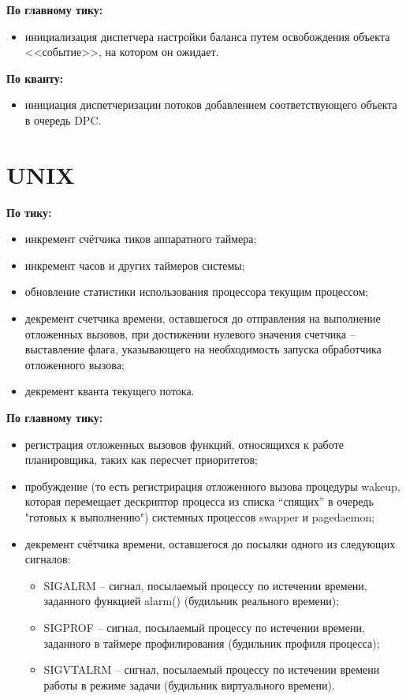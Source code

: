 \documentclass[a4paper, 12pt]{extreport}
\begin{document}
\textbf{По главному тику:}
\begin{itemize}
	\item инициализация диспетчера настройки баланса путем освобождения объекта <<событие>>, на котором он ожидает.
\end{itemize}

\textbf{По кванту:}
\begin{itemize}
	\item инициация диспетчеризации потоков добавлением соответствующего объекта в очередь DPC.
\end{itemize}

\section{UNIX}

\textbf{По тику:}
\begin{itemize}
	\item инкремент счётчика тиков аппаратного таймера;
	\item инкремент часов и других таймеров системы;
	\item обновление статистики использования процессора текущим процессом;
	\item декремент счетчика времени, оставшегося до отправления на выполнение отложенных вызовов, при достижении 
	нулевого значения счетчика -- выставление флага, указывающего на необходимость запуска обработчика отложенного 
	вызова;
	\item декремент кванта текущего потока.
\end{itemize}

\textbf{По главному тику:}
\begin{itemize}
	\item регистрация отложенных вызовов функций, относящихся к работе планировщика, таких как пересчет приоритетов;
	\item пробуждение (то есть регистрирация отложенного вызова процедуры wakeup, которая перемещает дескриптор 
	процесса из списка “спящих” в очередь "готовых к выполнению") системных процессов {\ttfamily swapper} и {\ttfamily 
	pagedaemon};
	\item декремент счётчика времени, оставшегося до посылки одного из следующих сигналов:
	\begin{itemize}
		\item {\ttfamily SIGALRM} – сигнал, посылаемый процессу по истечении времени, заданного функцией {\ttfamily 
		alarm()} (будильник реального времени);
		\item {\ttfamily SIGPROF} –  сигнал, посылаемый процессу по истечении времени, заданного в таймере 
		профилирования (будильник профиля процесса);
		\item {\ttfamily SIGVTALRM} –  сигнал, посылаемый процессу по истечении времени работы в режиме задачи 
		(будильник виртуального времени).
	\end{itemize}
\end{itemize}
\end{document}
